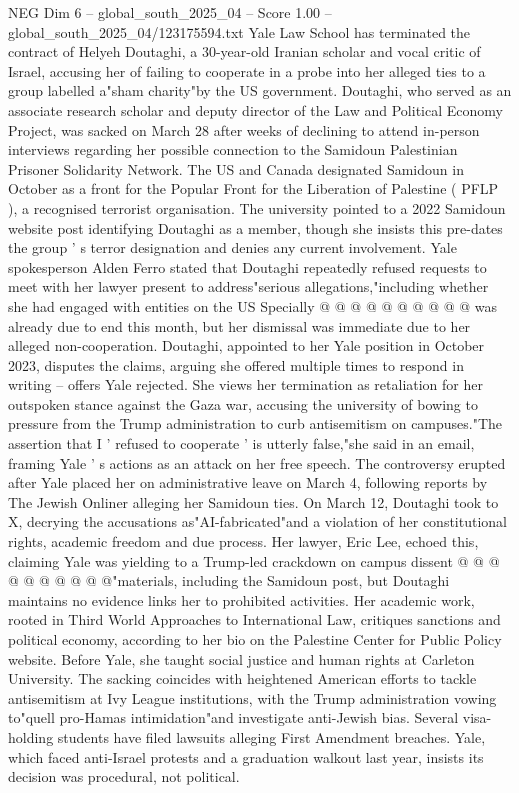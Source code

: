 \begin{textsample}{NEG Dim 6 – global\_south\_2025\_04 – Score 1.00 – global\_south\_2025\_04/123175594.txt}  \label{ex:f6_neg_215}
Yale Law School has terminated the contract of Helyeh Doutaghi, a 30-year-old Iranian scholar and vocal critic of Israel, accusing her of failing to cooperate in a probe into her alleged ties to a group labelled a"sham charity"by the US government.
Doutaghi, who served as an associate research scholar and deputy director of the Law and Political Economy Project, was sacked on March 28 after weeks of declining to attend in-person interviews regarding her possible connection to the Samidoun Palestinian Prisoner Solidarity Network.
The US and Canada designated Samidoun in October as a front for the Popular Front for the Liberation of Palestine ( PFLP ), a recognised terrorist organisation.
The university pointed to a 2022 Samidoun website post identifying Doutaghi as a member, though she insists this pre-dates the group ' s terror designation and denies any current involvement.
Yale spokesperson Alden Ferro stated that Doutaghi repeatedly refused requests to meet with her lawyer present to address"serious allegations,"including whether she had engaged with entities on the US Specially @ @ @ @ @ @ @ @ @ @ was already due to end this month, but her dismissal was immediate due to her alleged non-cooperation.
Doutaghi, appointed to her Yale position in October 2023, disputes the claims, arguing she offered multiple times to respond in writing -- offers Yale rejected.
She views her termination as retaliation for her outspoken stance against the Gaza war, accusing the university of bowing to pressure from the Trump administration to curb antisemitism on campuses."The assertion that I ' refused to cooperate ' is utterly false,"she said in an email, framing Yale ' s actions as an attack on her free speech.
The controversy erupted after Yale placed her on administrative leave on March 4, following reports by The Jewish Onliner alleging her Samidoun ties.
On March 12, Doutaghi took to X, decrying the accusations as"AI-fabricated"and a violation of her constitutional rights, academic freedom and due process.
Her lawyer, Eric Lee, echoed this, claiming Yale was yielding to a Trump-led crackdown on campus dissent @ @ @ @ @ @ @ @ @ @"materials, including the Samidoun post, but Doutaghi maintains no evidence links her to prohibited activities.
Her academic work, rooted in Third World Approaches to International Law, critiques sanctions and political economy, according to her bio on the Palestine Center for Public Policy website.
Before Yale, she taught social justice and human rights at Carleton University.
The sacking coincides with heightened American efforts to tackle antisemitism at Ivy League institutions, with the Trump administration vowing to"quell pro-Hamas intimidation"and investigate anti-Jewish bias.
Several visa-holding students have filed lawsuits alleging First Amendment breaches.
Yale, which faced anti-Israel protests and a graduation walkout last year, insists its decision was procedural, not political.

\end{textsample}

